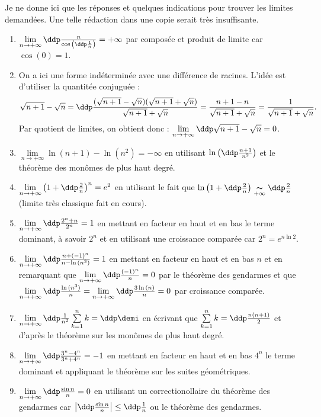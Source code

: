 
\begin{correction} \;
Je ne donne ici que les r\'eponses et quelques indications pour trouver les limites demand\'ees. Une telle r\'edaction dans une copie serait tr\`es insuffisante.
\begin{enumerate}
\item
$\lim \limits_{n\to +\infty}\ddp\frac{n}{\cos{\left(\ddp\frac{1}{n}  \right)}}=+\infty$ par compos\'ee et produit de limite car $\cos{(0)}=1$.
\item On a ici une forme ind\'etermin\'ee avec une diff\'erence de racines. L'id\'ee est d'utiliser la quantit\'ee conjugu\'ee :
$$\sqrt{n+1}-\sqrt{n} = \ddp \frac{(\sqrt{n+1}-\sqrt{n})(\sqrt{n+1}+\sqrt{n})}{\sqrt{n+1}+\sqrt{n}} = \frac{n+1-n}{\sqrt{n+1}+\sqrt{n}} = \frac{1}{\sqrt{n+1}+\sqrt{n}}.$$
Par quotient de limites, on obtient donc : $\lim \limits_{n\to +\infty}\ddp\sqrt{n+1}-\sqrt{n}=0$.
\item
$\lim \limits_{n\to +\infty}\ln{(n+1)}-\ln{(n^2)}=-\infty$ en utilisant $\ln{\left( \ddp\frac{n+1}{n^2} \right)}$ et le th\'eor\`{e}me des mon\^{o}mes de plus haut degr\'e.
\item
$\lim\limits_{n\to +\infty}\left(1+\ddp\frac{2}{n}\right)^n=e^2$ en utilisant le fait que $\ln{\left( 1+\ddp\frac{2}{n} \right)} \underset{+\infty}{\thicksim} \ddp\frac{2}{n}$ (limite tr\`{e}s classique fait en cours).
\item
$\lim \limits_{n\to +\infty}\ddp\frac{2^n+n}{2^n}=1$ en mettant en facteur en haut et en bas le terme dominant, \`a savoir $2^n$ et en utilisant une croissance compar\'ee car $2^n=e^{n\ln{2}}$. 
\item
$\lim \limits_{n\to +\infty}\ddp\frac{n+(-1)^n}{n-\ln{(n^3)}}=1$ en mettant en facteur en haut et en bas $n$ et en remarquant que $\lim\limits_{n\to +\infty} \ddp\frac{(-1)^n}{n}=0$ par le th\'eor\`eme des gendarmes et que $\lim\limits_{n\to +\infty} \ddp\frac{\ln{(n^3)}}{n}=\lim\limits_{n\to +\infty} \ddp\frac{3\ln{(n)}}{n}=0 $ par croissance compar\'ee.
\item
$\lim \limits_{n\to +\infty}\ddp\frac{1}{n^2}\sum\limits_{k=1}^n k= \ddp\demi$ en \'ecrivant que $\sum\limits_{k=1}^n k=\ddp\frac{n(n+1)}{2}$ et d'apr\`es le th\'eor\`eme sur les mon\^omes de plus haut degr\'e.
\item
$\lim \limits_{n\to +\infty}\ddp\frac{3^n-4^n}{3^n+4^n}=-1$ en mettant en facteur en haut et en bas $4^n$ le terme dominant et appliquant le th\'eor\`eme sur les suites g\'eom\'etriques.
\item
$\lim \limits_{n\to +\infty}\ddp\frac{\sin{n}}{n}=0$ en utilisant un correctionollaire du th\'eor\`eme des gendarmes car $\left| \ddp\frac{\sin{n}}{n} \right|\leq \ddp\frac{1}{n}$ ou le th\'eor\`{e}me des gendarmes.

\end{enumerate}
\end{correction}
